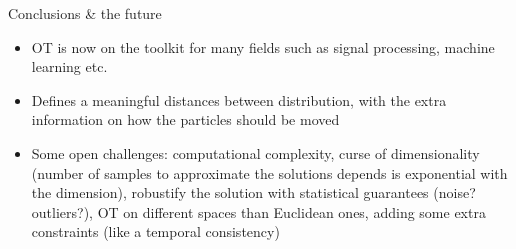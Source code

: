 \documentclass[pdf,aspectratio=169,10pt]{beamer}
\begin{document}
\begin{frame}{Conclusions \& the future}
    \begin{itemize}
        \item OT is now on the toolkit for many fields such as signal processing, machine learning etc.
        \item Defines a meaningful distances between distribution, with the extra information on how the particles should be moved
        \item Some open challenges: computational complexity, curse of dimensionality (number of samples to approximate the solutions depends is exponential with the dimension), robustify the solution with statistical guarantees (noise? outliers?), OT on different spaces than Euclidean ones, adding some extra constraints (like a temporal consistency)
    \end{itemize}
\end{frame}






\begin{frame}[plain]
    \titlepage
\end{frame}
\end{document}
